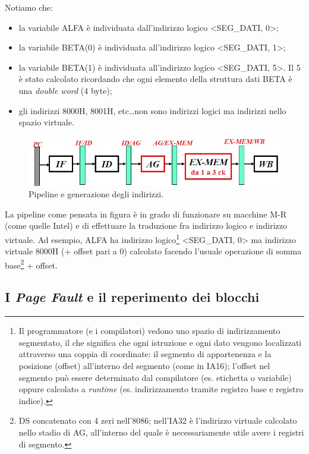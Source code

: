 Notiamo che:
\begin{itemize}
\item la variabile ALFA è individuata dall'indirizzo logico <SEG\_DATI, 0>;
\item la variabile BETA(0) è individuata all'indirizzo logico <SEG\_DATI, 1>;
\item la variabile BETA(1) è individuata all'indirizzo logico <SEG\_DATI, 5>. Il 5 è stato calcolato ricordando che ogni elemento della struttura dati BETA è una \textit{double word} (4 byte);
\item gli indirizzi 8000H, 8001H, etc\ldots non sono indirizzi logici ma indirizzi nello spazio virtuale.
\end{itemize}

\begin{figure}[!h]
\centering
\includegraphics[width=0.8\columnwidth]{img/pipelineIndirizzi}
\caption{Pipeline e generazione degli indirizzi.}
\label{fig:pipelineIndirizzi}
\end{figure}

La pipeline come pensata in figura è in grado di funzionare su macchine M-R (come quelle Intel) e di effettuare la traduzione fra indirizzo logico e indirizzo virtuale. Ad esempio, ALFA ha indirizzo logico\footnote{Il programmatore (e i compilatori) vedono uno spazio di indirizzamento segmentato, il che significa che ogni istruzione e ogni dato vengono localizzati attraverso una coppia di coordinate: il segmento di appartenenza e la posizione (offset) all'interno del segmento (come in IA16); l'offset nel segmento può essere determinato dal compilatore (es. etichetta o variabile) oppure calcolato a \textit{runtime} (es. indirizzamento tramite registro base e registro indice).
} <SEG\_DATI, 0> ma indirizzo virtuale 8000H (+ offset pari a 0) calcolato facendo l'usuale operazione di somma base\footnote{DS concatenato con 4 zeri nell'8086; nell'IA32 è l'indirizzo virtuale calcolato nello stadio di AG, all'interno del quale è necessariamente utile avere i registri di segmento.} + offset.

\subsection{I \textit{Page Fault} e il reperimento dei blocchi}
\label{sec:pageFault}

